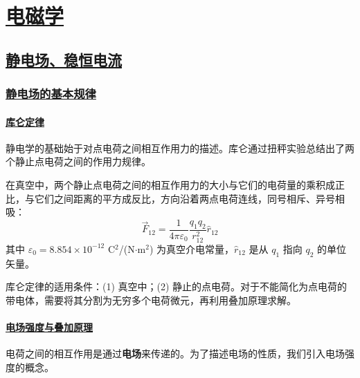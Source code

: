 \chapter{\protect\hyperlink{:}{电磁学}}


\section{\protect\hyperlink{:}{静电场、稳恒电流}}


\subsection{\protect\hyperlink{:}{静电场的基本规律}}

\subsubsection{\protect\hyperlink{:}{库仑定律}}

静电学的基础始于对点电荷之间相互作用力的描述。库仑通过扭秤实验总结出了两个静止点电荷之间的作用力规律。

\begin{theorem}[库仑定律]
    在真空中，两个静止点电荷之间的相互作用力的大小与它们的电荷量的乘积成正比，与它们之间距离的平方成反比，方向沿着两点电荷连线，同号相斥、异号相吸：
    \begin{equation}
        \vec{F}_{12} = \frac{1}{4\pi\varepsilon_0}\frac{q_1 q_2}{r_{12}^2}\hat{r}_{12}
    \end{equation}
    其中 $\varepsilon_0 = 8.854 \times 10^{-12}$ C$^2$/(N$\cdot$m$^2$) 为真空介电常量，$\hat{r}_{12}$ 是从 $q_1$ 指向 $q_2$ 的单位矢量。
\end{theorem}

\begin{remark}
    库仑定律的适用条件：(1) 真空中；(2) 静止的点电荷。对于不能简化为点电荷的带电体，需要将其分割为无穷多个电荷微元，再利用叠加原理求解。
\end{remark}

\subsubsection{\protect\hyperlink{:}{电场强度与叠加原理}}

电荷之间的相互作用是通过\textbf{电场}来传递的。为了描述电场的性质，我们引入电场强度的概念。

